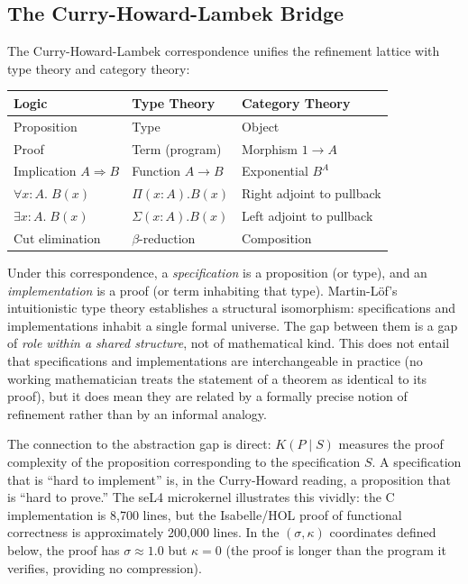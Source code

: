 \documentclass[11pt, a4paper, logo, copyright]{googledeepmind}
\begin{document}
\subsection{The Curry-Howard-Lambek Bridge}

The Curry-Howard-Lambek correspondence \citep{martinlof1979constructive, wadler2015propositions, lambek1986higher} unifies the refinement lattice with type theory and category theory:

\begin{center}
\small
\begin{tabular}{lll}
\toprule
\textbf{Logic} & \textbf{Type Theory} & \textbf{Category Theory} \\
\midrule
Proposition & Type & Object \\
Proof & Term (program) & Morphism $1 \to A$ \\
Implication $A \Rightarrow B$ & Function $A \to B$ & Exponential $B^A$ \\
$\forall x{:}A.\; B(x)$ & $\Pi(x{:}A).B(x)$ & Right adjoint to pullback \\
$\exists x{:}A.\; B(x)$ & $\Sigma(x{:}A).B(x)$ & Left adjoint to pullback \\
Cut elimination & $\beta$-reduction & Composition \\
\bottomrule
\end{tabular}
\end{center}

Under this correspondence, a \emph{specification} is a proposition (or type), and an \emph{implementation} is a proof (or term inhabiting that type). Martin-L\"{o}f's intuitionistic type theory \citep{martinlof1979constructive} establishes a structural isomorphism: specifications and implementations inhabit a single formal universe. The gap between them is a gap of \emph{role within a shared structure}, not of mathematical kind. This does not entail that specifications and implementations are interchangeable in practice (no working mathematician treats the statement of a theorem as identical to its proof), but it does mean they are related by a formally precise notion of refinement rather than by an informal analogy.

The connection to the abstraction gap is direct: $K(P \mid S)$ measures the proof complexity of the proposition corresponding to the specification $S$. A specification that is ``hard to implement'' is, in the Curry-Howard reading, a proposition that is ``hard to prove.'' The seL4 microkernel illustrates this vividly: the C implementation is 8,700 lines, but the Isabelle/HOL proof of functional correctness is approximately 200,000 lines. In the $(\sigma, \kappa)$ coordinates defined below, the proof has $\sigma \approx 1.0$ but $\kappa = 0$ (the proof is longer than the program it verifies, providing no compression).
\end{document}
